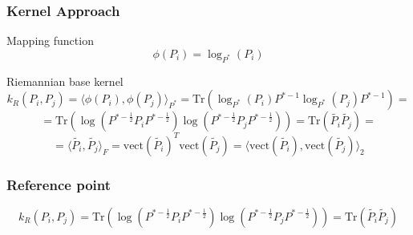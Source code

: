 \documentclass{beamer}
\begin{document}
\begin{frame}
\frametitle{Kernel Approach}

\begin{block}{Mapping function}
	\begin{equation*}
		\phi (P_i) = \log_{P^*}(P_i)
	\end{equation*}
\end{block}
\begin{block}{Riemannian base kernel}
	\begin{equation*}
 k_R(P_i,P_j) = \langle 	\phi (P_i), 	\phi (P_j)\rangle_{P^*} = \text{Tr}( \log_{P^*}(P_i)P^{*-1} \log_{P^*}(P_j)P^{*-1}) = 
	\end{equation*}
	\begin{equation*}
 =	\text{Tr}( \log (P^{*-\frac12}P_i P^{*-\frac12}) \log (P^{*-\frac12}P_j P^{*-\frac12})) =	\text{Tr}(\tilde{P_i}\tilde{P_j}) = 
	\end{equation*}
	\begin{equation*}
	= \langle \tilde{P_i},\tilde{P_j} \rangle_F =  \text{vect}(\tilde{P_i})^T  \text{vect}(\tilde{P_j}) =  \langle  \text{vect}(\tilde{P_i}), \text{vect}(\tilde{P_j}) \rangle_2
	\end{equation*}
\end{block}

\end{frame}



\begin{frame}
\frametitle{Reference point}
	\begin{equation*}
k_R(P_i,P_j) = \text{Tr}( \log (P^{*-\frac12}P_i P^{*-\frac12}) \log (P^{*-\frac12}P_j P^{*-\frac12})) =	\text{Tr}(\tilde{P_i}\tilde{P_j})
\end{equation*}

\end{frame}
\end{document}

